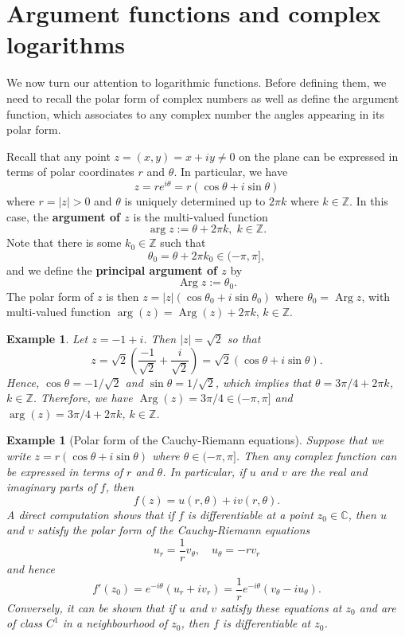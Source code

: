 \documentclass[10pt]{article}
\newcommand{\C}{\mathbb{C}}
\newcommand{\Z}{\mathbb{Z}}
\DeclareMathOperator{\Arg}{Arg}
\theoremstyle{newstyle}
\newtheorem{exmp}[thm]{Example}
\begin{document}
\newpage 
\section{Argument functions and complex logarithms}

We now turn our attention to logarithmic functions. Before defining them, we need to recall the polar form of complex numbers as well as define the argument function, which associates to any complex number the angles appearing in its polar form.

Recall that any point $z = (x, y) = x+iy \neq 0$ on the plane can be expressed in terms of 
polar coordinates $r$ and $\theta$. In particular, we have 
\[ z = re^{i\theta} = r(\cos\theta + i\sin\theta) \]
where $r = |z| > 0$ and $\theta$ is uniquely determined up to $2\pi k$ where $k \in \Z$. 
In this case, the {\bf argument of $z$} is the multi-valued function 
\[ \arg z := \theta + 2\pi k, \; k \in \Z. \]
Note that there is some $k_0 \in \Z$ such that 
\[ \theta_0 = \theta + 2\pi k_0 \in (-\pi, \pi], \]
and we define the {\bf principal argument of $z$} by 
\[ \Arg z := \theta_0. \]
The polar form of $z$ is then $z = |z| (\cos\theta_0 + i\sin\theta_0)$ where 
$\theta_0 = \Arg z$, with multi-valued function $\arg(z) = \Arg(z) + 2\pi k$, $k \in \Z$. 

\begin{exmp}
Let $z = -1+i$. Then $|z| = \sqrt2$ so that 
\[ z = \sqrt2 \left( \frac{-1}{\sqrt2} + \frac{i}{\sqrt2} \right) = \sqrt2 (\cos\theta + i\sin\theta). \] 
Hence, $\cos\theta = -1/\sqrt2$ and $\sin\theta = 1/\sqrt2$, which implies that 
$\theta = 3\pi/4 + 2\pi k$, $k \in \Z$. Therefore, we have $\Arg(z) = 3\pi/4 \in (-\pi, \pi]$ and
$\arg(z) = 3\pi/4 + 2\pi k$, $k \in \Z$. 
\end{exmp}

\begin{exmp}[Polar form of the Cauchy-Riemann equations]
Suppose that we write $z = r(\cos\theta + i\sin\theta)$ where $\theta \in (-\pi, \pi]$. 
Then any complex function can be expressed in terms of $r$ and $\theta$. In particular, 
if $u$ and $v$ are the real and imaginary parts of $f$, then 
\[ f(z) = u(r, \theta) + iv(r, \theta). \]
A direct computation shows that if $f$ is differentiable at a point $z_0 \in \C$, then 
$u$ and $v$ satisfy the polar form of the Cauchy-Riemann equations 
\[ u_r = \frac1rv_\theta, \quad u_\theta = -rv_r \]
and hence 
\[ f'(z_0) = e^{-i\theta}(u_r + iv_r) = \frac1r e^{-i\theta} (v_\theta - iu_\theta). \]
Conversely, it can be shown that if $u$ and $v$ satisfy these equations at $z_0$ and are 
of class $C^1$ in a neighbourhood of $z_0$, then $f$ is differentiable at $z_0$. 
\end{exmp}
\end{document}
